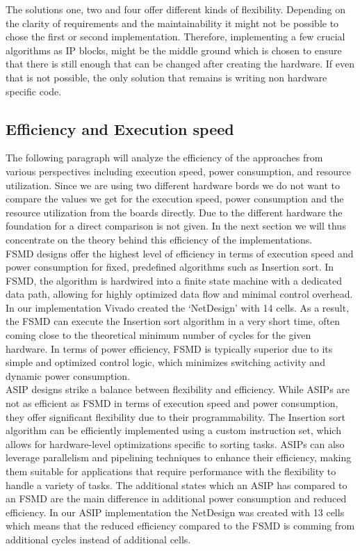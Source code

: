 \documentclass[conference]{IEEEtran}
\begin{document}
The solutions one, two and four offer different kinds of flexibility. Depending on the clarity of requirements and the maintainability it might not be possible to chose the first or second implementation. Therefore, implementing a few crucial algorithms as IP blocks, might be the middle ground which is chosen to ensure that there is still enough that can be changed after creating the hardware. If even that is not possible, the only solution that remains is writing non hardware specific code.

\subsection{Efficiency and Execution speed}
The following paragraph will analyze the efficiency of the approaches from various perspectives including execution speed, power consumption, and resource utilization. Since we are using two different hardware bords we do not want to compare the values we get for the execution speed, power consumption and the resource utilization from the boards directly. Due to the different hardware the foundation for a direct comparison is not given. In the next section we will thus concentrate on the theory behind this efficiency of the implementations.\\
FSMD designs offer the highest level of efficiency in terms of execution speed and power consumption for fixed, predefined algorithms such as Insertion sort. In FSMD, the algorithm is hardwired into a finite state machine with a dedicated data path, allowing for highly optimized data flow and minimal control overhead. In our implementation Vivado created the `NetDesign' with 14 cells. As a result, the FSMD can execute the Insertion sort algorithm in a very short time, often coming close to the theoretical minimum number of cycles for the given hardware. In terms of power efficiency, FSMD is typically superior due to its simple and optimized control logic, which minimizes switching activity and dynamic power consumption.\\
ASIP designs strike a balance between flexibility and efficiency. While ASIPs are not as efficient as FSMD in terms of execution speed and power consumption, they offer significant flexibility due to their programmability. The Insertion sort algorithm can be efficiently implemented using a custom instruction set, which allows for hardware-level optimizations specific to sorting tasks. ASIPs can also leverage parallelism and pipelining techniques to enhance their efficiency, making them suitable for applications that require performance with the flexibility to handle a variety of tasks. The additional states which an ASIP has compared to an FSMD are the main difference in additional power consumption and reduced efficiency. In our ASIP implementation the NetDesign was created with 13 cells which means that the reduced efficiency compared to the FSMD is comming from additional cycles instead of additional cells.\\
\end{document}
